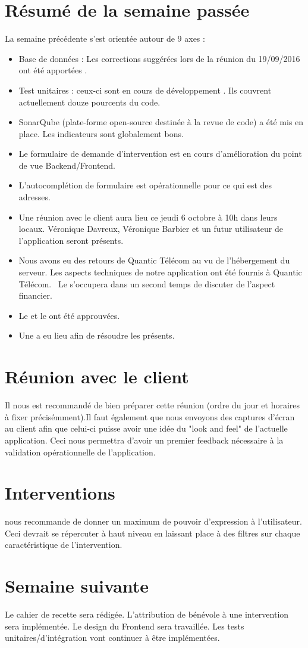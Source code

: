 \documentclass [a4paper] {article}
\begin{document}
\section{Résumé de la semaine passée}
La semaine précédente s'est orientée autour de 9 axes :  
\begin{itemize}
\item Base de données : Les corrections suggérées lors de la réunion du 19/09/2016 ont été apportées .
\item Test unitaires : ceux-ci sont en cours de développement . Ils couvrent actuellement douze pourcents du code.
\item SonarQube (plate-forme open-source destinée à la revue de code) a été mis en place. Les indicateurs sont globalement bons. 
\item Le formulaire de demande d'intervention est en cours d'amélioration du point de vue Backend/Frontend.
\item L'autocomplétion de formulaire est opérationnelle pour ce qui est des adresses.
\item Une réunion avec le client aura lieu ce jeudi 6 octobre à 10h dans leurs locaux. Véronique Davreux, Véronique Barbier et un futur utilisateur de l'application seront présents.
\item Nous avons eu des retours de Quantic Télécom au vu de l'hébergement du serveur. Les aspects techniques de notre application ont été fournis à Quantic Télécom. \ Le \CP{} s'occupera dans un second temps de discuter de l'aspect financier. 
\item Le \PQ{} et le \PGC{} ont été approuvées.
\item Une \CTFT{} a eu lieu afin de résoudre les \FT{} présents.
\end{itemize} 

\section{Réunion avec le client}
Il nous est recommandé de bien préparer cette réunion (ordre du jour et horaires à fixer précisémment).Il faut également que nous envoyons des captures d'écran au client afin que celui-ci puisse avoir une idée du "look and feel" de l'actuelle application. Ceci nous permettra d'avoir un premier feedback nécessaire à la validation opérationnelle de l'application.

\section{Interventions}
\nomTuteurPedago{} nous recommande de donner un maximum de pouvoir d'expression à l'utilisateur. Ceci devrait se répercuter à haut niveau en laissant place à des filtres sur chaque caractéristique de l'intervention. 

\section{Semaine suivante}
Le cahier de recette sera rédigée. L'attribution de bénévole à une intervention sera implémentée. Le design du Frontend sera travaillée. Les tests unitaires/d'intégration vont continuer à être implémentées.


\newpage
\end{document}
